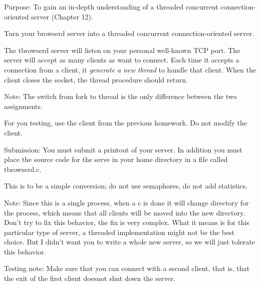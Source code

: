 

\parindent 0pt

Purpose: To gain an in-depth understanding of
a threaded concurrent connection-oriented server (Chapter 12).

Turn your browserd server into a {\ltt{}threaded} concurrent
connection-oriented server.

The {\ltt{}tbrowserd} server will listen on your personal well-known TCP port.
The server will accept as many clients as want to connect.
Each time it accepts a connection from a client,
it {\it generate a new thread} to handle that client. 
When the client closes the socket, the thread procedure should return.

Note: The switch from fork to thread is the only difference between
the two assignments.

For you testing, use the client from the previous homework.
Do not modify the client.

Submission: You must submit a printout of your server.
In addition you must place the source code for the serve in your
home directory in a file called {\ltt{}tbrowserd.c}.

This is to be a simple conversion;
do not use semaphores, do not add statistics.

Note: Since this is a single process, when a {\ltt{}c} is done
it will change directory for the process, which means that
all clients will be moved into the new directory.
Don't try to fix this behavior, the fix is very complex.
What it means is for this particular type of server,
a threaded implementation might not be the best choice.
But I didn't want you to write a whole new server, so
we will just tolerate this behavior.

Testing note: Make sure that you can connect with a second client,
that is, that the exit of the first client doesnot shut down the
server.

\bye
